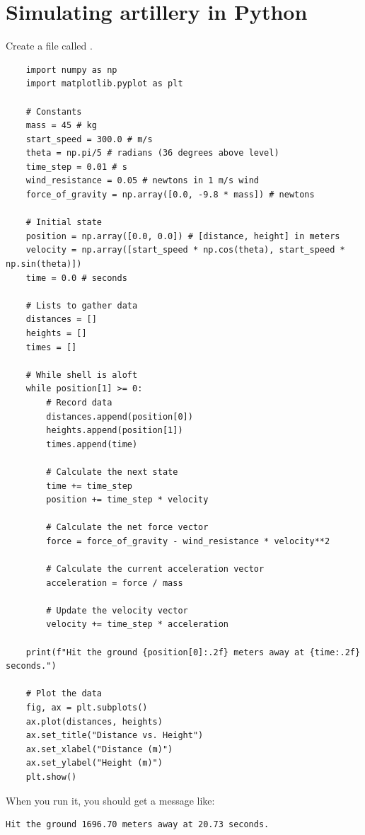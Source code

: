 \section{Simulating artillery in Python}

Create a file called .

\begin{Verbatim}
    import numpy as np
    import matplotlib.pyplot as plt
    
    # Constants
    mass = 45 # kg
    start_speed = 300.0 # m/s
    theta = np.pi/5 # radians (36 degrees above level)
    time_step = 0.01 # s
    wind_resistance = 0.05 # newtons in 1 m/s wind
    force_of_gravity = np.array([0.0, -9.8 * mass]) # newtons
    
    # Initial state
    position = np.array([0.0, 0.0]) # [distance, height] in meters
    velocity = np.array([start_speed * np.cos(theta), start_speed * np.sin(theta)])
    time = 0.0 # seconds
    
    # Lists to gather data
    distances = []
    heights = []
    times = []
    
    # While shell is aloft
    while position[1] >= 0:
        # Record data
        distances.append(position[0])
        heights.append(position[1])
        times.append(time)
    
        # Calculate the next state
        time += time_step
        position += time_step * velocity
    
        # Calculate the net force vector
        force = force_of_gravity - wind_resistance * velocity**2
    
        # Calculate the current acceleration vector
        acceleration = force / mass
    
        # Update the velocity vector   
        velocity += time_step * acceleration
    
    print(f"Hit the ground {position[0]:.2f} meters away at {time:.2f} seconds.")
    
    # Plot the data
    fig, ax = plt.subplots()
    ax.plot(distances, heights)
    ax.set_title("Distance vs. Height")
    ax.set_xlabel("Distance (m)")
    ax.set_ylabel("Height (m)")
    plt.show()        
\end{Verbatim}

When you run it, you should get a message like:
\begin{Verbatim}
Hit the ground 1696.70 meters away at 20.73 seconds.
\end{Verbatim}

